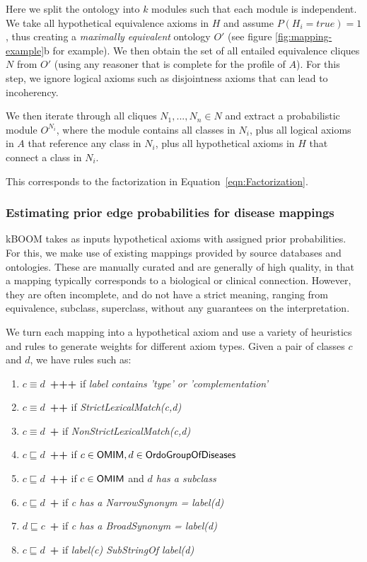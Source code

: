 \documentclass{my}
\newcommand{\pr}[1]{\mbox{\sf #1}}
\def\OMIM{\pr{OMIM}}
\def\OrdoGroup{\pr{OrdoGroupOfDiseases}}
\newcommand{\eqnref}[1]{Equation~\ref{eqn:#1}}
\begin{document}
Here we split the ontology into $k$ modules such that each module is
independent. We take all hypothetical equivalence axioms in $H$ and
assume $P(H_i=true)=1$, thus creating a \emph{maximally equivalent}
ontology $O'$ (see figure \ref{fig:mapping-example}b for example). We
then obtain the set of all entailed equivalence cliques $N$ from $O'$
(using any reasoner that is complete for the profile of $A$). For this
step, we ignore logical axioms such as disjointness axioms that can
lead to incoherency.

We then iterate through all cliques $N_1,...,N_n \in N$ and extract a
probabilistic module $O^{N_i}$, where the module contains all classes
in $N_i$, plus all logical axioms in $A$ that reference any class in
$N_i$, plus all hypothetical axioms in $H$ that connect a class in
$N_i$.

This corresponds to the factorization in \eqnref{Factorization}.


\subsubsection{Estimating prior edge probabilities for disease mappings}

kBOOM takes as inputs hypothetical axioms with assigned prior
probabilities. For this, we make use of existing mappings provided by
source databases and ontologies. These are manually curated and are
generally of high quality, in that a mapping typically corresponds to
a biological or clinical connection. However, they are often
incomplete, and do not have a strict meaning, ranging from
equivalence, subclass, superclass, without any guarantees on the
interpretation.

We turn each mapping into a hypothetical axiom and use a variety of
heuristics and rules to generate weights for different axiom
types. Given a pair of classes $c$ and $d$, we have rules such as:

\begin{enumerate}
\item $c \equiv d$\ \textbf{+++} if \emph{label contains 'type' or 'complementation'}
\item $c \equiv d$\ \textbf{++} if \emph{StrictLexicalMatch(c,d)}
\item $c \equiv d$\ \textbf{+} if \emph{NonStrictLexicalMatch(c,d)}
\item $c \sqsubseteq d$\ \textbf{++} if $c \in \OMIM, d \in \OrdoGroup$ 
\item $c \sqsubseteq d$\ \textbf{++} if $c \in \OMIM$ and \emph{$d$ has a subclass}
\item $c \sqsubseteq d$\ \textbf{+} if \emph{c has a NarrowSynonym = label(d)}
\item $d \sqsubseteq c$\ \textbf{+} if \emph{c has a BroadSynonym = label(d)}
\item $c \sqsubseteq d$\ \textbf{+} if \emph{label(c) SubStringOf label(d)}
\end{enumerate}
\end{document}
